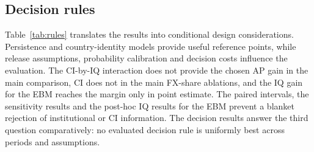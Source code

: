 \documentclass[preprint,12pt,authoryear]{elsarticle}
\begin{document}
\subsection{Decision rules}
Table~\ref{tab:rules} translates the results into conditional design considerations. Persistence and country-identity models provide useful reference points, while release assumptions, probability calibration and decision costs influence the evaluation. The CI-by-IQ interaction does not provide the chosen AP gain in the main comparison, CI does not in the main FX-share ablations, and the IQ gain for the EBM reaches the margin only in point estimate. The paired intervals, the sensitivity results and the post-hoc IQ results for the EBM prevent a blanket rejection of institutional or CI information. The decision results answer the third question comparatively: no evaluated decision rule is uniformly best across periods and assumptions.
\end{document}

